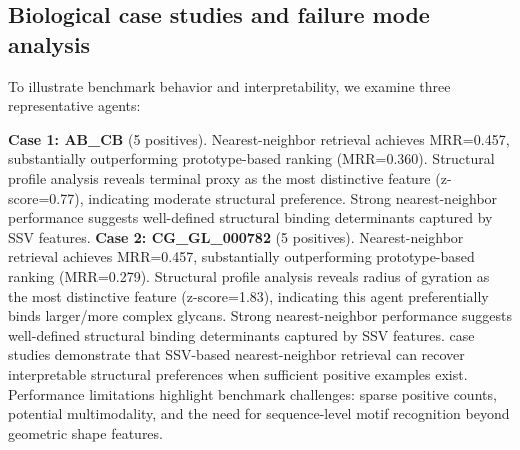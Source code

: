 \subsection{Biological case studies and failure mode analysis}

To illustrate benchmark behavior and interpretability, we examine three representative agents:

\textbf{Case 1: AB_CB} (5 positives). Nearest-neighbor retrieval achieves MRR=0.457, substantially outperforming prototype-based ranking (MRR=0.360). Structural profile analysis reveals terminal proxy as the most distinctive feature (z-score=0.77), indicating moderate structural preference. Strong nearest-neighbor performance suggests well-defined structural binding determinants captured by SSV features. \n\n\textbf{Case 2: CG_GL_000782} (5 positives). Nearest-neighbor retrieval achieves MRR=0.457, substantially outperforming prototype-based ranking (MRR=0.279). Structural profile analysis reveals radius of gyration as the most distinctive feature (z-score=1.83), indicating this agent preferentially binds larger/more complex glycans. Strong nearest-neighbor performance suggests well-defined structural binding determinants captured by SSV features. \n\nThese case studies demonstrate that SSV-based nearest-neighbor retrieval can recover interpretable structural preferences when sufficient positive examples exist. Performance limitations highlight benchmark challenges: sparse positive counts, potential multimodality, and the need for sequence-level motif recognition beyond geometric shape features.\n